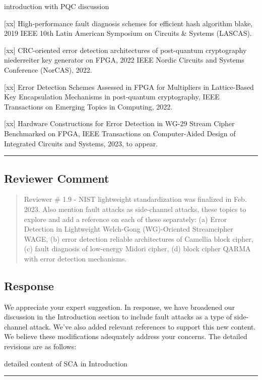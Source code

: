 \color{blue}

introduction with PQC discussion


	[xx] High-performance fault diagnosis schemes for efficient hash algorithm blake, 2019 IEEE 10th Latin American Symposium on Circuits \& Systems (LASCAS).

	[xx] CRC-oriented error detection architectures of post-quantum cryptography niederreiter key generator on FPGA, 2022 IEEE Nordic Circuits and Systems Conference (NorCAS), 2022.

	[xx] Error Detection Schemes Assessed in FPGA for Multipliers in Lattice-Based Key Encapsulation Mechanisms in post-quantum cryptography, IEEE Transactions on Emerging Topics in Computing, 2022.

	[xx] Hardware Constructions for Error Detection in WG-29 Stream Cipher Benchmarked on FPGA, IEEE Transactions on Computer-Aided Design of Integrated Circuits and Systems, 2023, to appear.

\color{black}

\noindent\rule{\linewidth}{2.0pt}

\subsection{Reviewer Comment}
\begin{mdframed}
	\begin{quote}
		Reviewer \# 1.9 - NIST lightweight standardization was finalized in Feb. 2023. Also mention fault attacks as side-channel attacks, these topics to explore and add a reference on each of these separately: (a) Error Detection in Lightweight Welch-Gong (WG)-Oriented Streamcipher WAGE, (b) error detection reliable architectures of Camellia block cipher, (c) fault diagnosis of low-energy Midori cipher, (d) block cipher QARMA with error detection mechanisms.
	\end{quote}
\end{mdframed}

\subsection{Response}

We appreciate your expert suggestion. In response, we have broadened our discussion in the Introduction section to include fault attacks as a type of side-channel attack. We've also added relevant references to support this new content. We believe these modifications adequately address your concerns. The detailed revisions are as follows:

\color{blue}

detailed content of SCA in Introduction



\color{black}


\noindent\rule{\linewidth}{6.0pt}